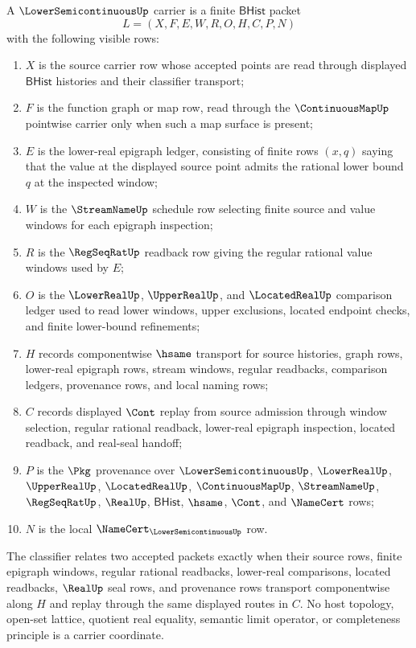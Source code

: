 \begin{definition}
\label{def:lower-semicontinuous-carrier}
A $\LowerSemicontinuousUp$ carrier is a finite $\mathsf{BHist}$ packet
$$
L=(X,F,E,W,R,O,H,C,P,N)
$$
with the following visible rows:
\begin{enumerate}
\item $X$ is the source carrier row whose accepted points are read through
  displayed $\mathsf{BHist}$ histories and their classifier transport;
\item $F$ is the function graph or map row, read through the
  $\ContinuousMapUp$ pointwise carrier only when such a map surface is present;
\item $E$ is the lower-real epigraph ledger, consisting of finite rows
  $(x,q)$ saying that the value at the displayed source point admits the
  rational lower bound $q$ at the inspected window;
\item $W$ is the $\StreamNameUp$ schedule row selecting finite source and
  value windows for each epigraph inspection;
\item $R$ is the $\RegSeqRatUp$ readback row giving the regular rational
  value windows used by $E$;
\item $O$ is the $\LowerRealUp$, $\UpperRealUp$, and $\LocatedRealUp$
  comparison ledger used to read lower windows, upper exclusions, located
  endpoint checks, and finite lower-bound refinements;
\item $H$ records componentwise $\hsame$ transport for source histories,
  graph rows, lower-real epigraph rows, stream windows, regular readbacks,
  comparison ledgers, provenance rows, and local naming rows;
\item $C$ records displayed $\Cont$ replay from source admission through
  window selection, regular rational readback, lower-real epigraph inspection,
  located readback, and real-seal handoff;
\item $P$ is the $\Pkg$ provenance over $\LowerSemicontinuousUp$,
  $\LowerRealUp$, $\UpperRealUp$, $\LocatedRealUp$, $\ContinuousMapUp$,
  $\StreamNameUp$, $\RegSeqRatUp$, $\RealUp$, $\mathsf{BHist}$, $\hsame$,
  $\Cont$, and $\NameCert$ rows;
\item $N$ is the local $\NameCert_{\LowerSemicontinuousUp}$ row.
\end{enumerate}
The classifier relates two accepted packets exactly when their source rows,
finite epigraph windows, regular rational readbacks, lower-real comparisons,
located readbacks, $\RealUp$ seal rows, and provenance rows transport
componentwise along $H$ and replay through the same displayed routes in $C$.
No host topology, open-set lattice, quotient real equality, semantic limit
operator, or completeness principle is a carrier coordinate.
\end{definition}

